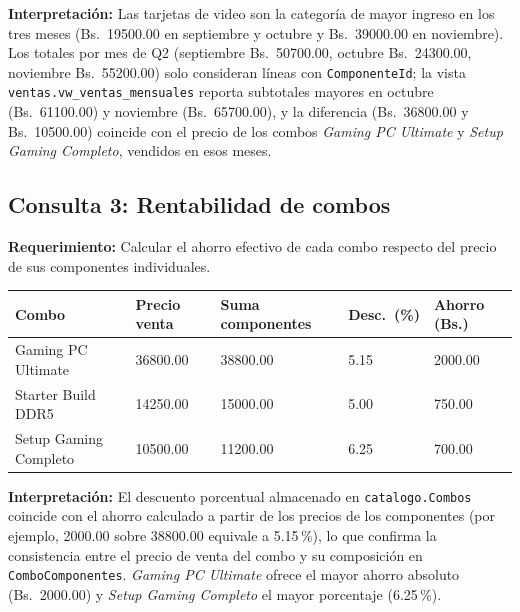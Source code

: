 \textbf{Interpretación:} Las tarjetas de video son la categoría de mayor ingreso en los tres meses (Bs.\ 19500.00 en septiembre y octubre y Bs.\ 39000.00 en noviembre).
Los totales por mes de Q2 (septiembre Bs.\ 50700.00, octubre Bs.\ 24300.00, noviembre Bs.\ 55200.00) solo consideran líneas con \texttt{ComponenteId}; la vista \texttt{ventas.vw\_ventas\_mensuales} reporta subtotales mayores en octubre (Bs.\ 61100.00) y noviembre (Bs.\ 65700.00), y la diferencia (Bs.\ 36800.00 y Bs.\ 10500.00) coincide con el precio de los combos \textit{Gaming PC Ultimate} y \textit{Setup Gaming Completo}, vendidos en esos meses.

\subsection{Consulta 3: Rentabilidad de combos}

\textbf{Requerimiento:} Calcular el ahorro efectivo de cada combo respecto del precio de sus componentes individuales.



\begin{center}
\label{tab:q3}
\begin{tablaAPA}
\begin{tabular}{L{4.2cm} R{2.5cm} R{2.8cm} R{1.9cm} R{2.4cm}}
\toprule
\textbf{Combo} & \textbf{Precio venta} & \textbf{Suma componentes} & \textbf{Desc.\ (\%)} & \textbf{Ahorro (Bs.)} \\
\midrule
Gaming PC Ultimate & 36800.00 & 38800.00 & 5.15 & 2000.00 \\
Starter Build DDR5 & 14250.00 & 15000.00 & 5.00 & 750.00 \\
Setup Gaming Completo & 10500.00 & 11200.00 & 6.25 & 700.00 \\
\bottomrule
\end{tabular}
\end{tablaAPA}
\end{center}

\textbf{Interpretación:} El descuento porcentual almacenado en \texttt{catalogo.Combos} coincide con el ahorro calculado a partir de los precios de los componentes (por ejemplo, 2000.00 sobre 38800.00 equivale a 5.15\,\%), lo que confirma la consistencia entre el precio de venta del combo y su composición en \texttt{ComboComponentes}.
\textit{Gaming PC Ultimate} ofrece el mayor ahorro absoluto (Bs.\ 2000.00) y \textit{Setup Gaming Completo} el mayor porcentaje (6.25\,\%).

